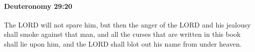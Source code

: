 
		\paragraph{Deuteronomy 29:20} %
			\label{DEUTERONOMY-29-20}

			The LORD will not spare him, but then the anger of the LORD and his jealousy shall smoke against that man, and all the curses that are written in this book shall lie upon him, and the LORD shall blot out his name from under heaven.


